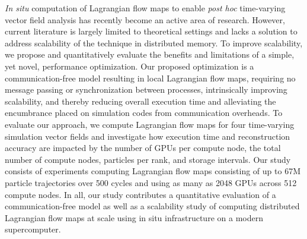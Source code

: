 \textit{In situ} computation of Lagrangian flow maps to enable \textit{post hoc} time-varying vector field analysis has recently become an active area of research. 
%
However, current literature is largely limited to theoretical settings and lacks a solution to address scalability of the technique in distributed memory.
%
To improve scalability, we propose and quantitatively evaluate the benefits and limitations of a simple, yet novel, performance optimization.
%
Our proposed optimization is a communication-free model resulting in local Lagrangian flow maps, requiring no message passing or synchronization between processes, intrinsically improving scalability, and thereby reducing overall execution time and alleviating the encumbrance placed on simulation codes from communication overheads.
%
To evaluate our approach, we compute Lagrangian flow maps for four time-varying simulation vector fields and investigate how execution time and reconstruction accuracy are impacted by the number of GPUs per compute node, the total number of compute nodes, particles per rank, and storage intervals. 
%
Our study consists of experiments computing Lagrangian flow maps consisting of up to 67M particle trajectories over 500 cycles and using as many as 2048 GPUs across 512 compute nodes.
%
In all, our study contributes a quantitative evaluation of a communication-free model as well as a scalability study of computing distributed Lagrangian flow maps at scale using in situ infrastructure on a modern supercomputer.
%
